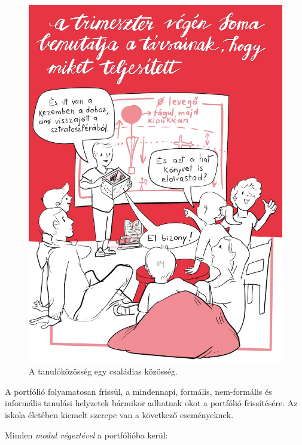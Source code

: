 \begin{figure}
\centering
\includegraphics{pics/4a_portfolio_soma.jpg}
\caption{A tanulóközösség egy családias közösség.}
\end{figure}

A portfólió folyamatosan frissül, a mindennapi, formális, nem-for\-má\-lis
és informális tanulási helyzetek bármikor adhatnak okot a portfólió
frissítésére. Az iskola életében kiemelt szerepe van a következő
eseményeknek.

Minden \emph{modul végeztével} a portfólióba kerül:

